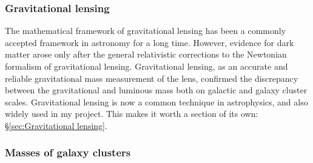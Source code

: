 \documentclass[paper=a4, fontsize=11pt]{scrartcl} %
\numberwithin{equation}{section} %
\numberwithin{figure}{section} %
\numberwithin{table}{section} %
\begin{document}
\subsubsection{Gravitational lensing}

The mathematical framework of gravitational lensing has been a commonly accepted framework in astronomy for a long time. However, evidence for dark matter arose only after the general relativistic corrections to the Newtonian formalism of gravitational lensing. Gravitational lensing, as an accurate and reliable gravitational mass measurement of the lens, confirmed the discrepancy between the gravitational and luminous mass both on galactic and galaxy cluster scales. Gravitational lensing is now a common technique in astrophysics, and also widely used in my project. This makes it worth a section of its own: \S \ref{sec:Gravitational lensing}.

\subsubsection{Masses of galaxy clusters}

\end{document}
